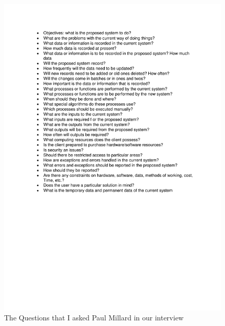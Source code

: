 \begin{figure}[H]
    \includegraphics[width=\textwidth]{./TeamCambridgeSpec/Questions.pdf}
    \caption{The Questions that I asked Paul Millard in our interview} \label{fig:Questions}
\end{figure}

